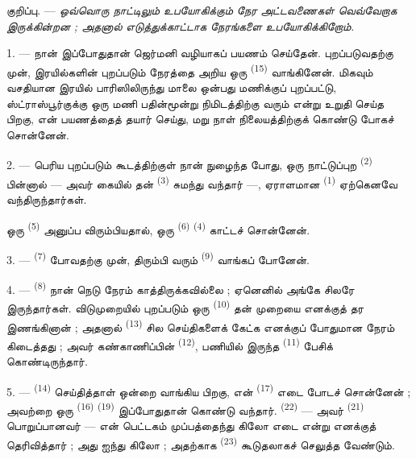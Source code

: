\VUsaut{4.0mm}
\VUsaut{2.4mm}
\VUsaut{3.4mm}
\textsc{குறிப்பு.} --- \textit{ஒவ்வொரு நாட்டிலும் உபயோகிக்கும் நேர}
\textit{அட்டவணைகள் வெவ்வேறாக இருக்கின்றன ; அதனால் எடுத்துக்காட்டாக}
 \textit{நேரங்களை உபயோகிக்கிறோம்.}

1. --- நான் இப்போதுதான் ஜெர்மனி வழியாகப் பயணம் செய்தேன். புறப்படுவதற்கு
முன், இரயில்களின் புறப்படும் நேரத்தை அறிய ஒரு  \textsuperscript{(15)} வாங்கினேன். மிகவும் வசதியான இரயில்
பாரிஸிலிருந்து மாலை ஒன்பது மணிக்குப் புறப்பட்டு, ஸ்ட்ராஸ்பூர்குக்கு
ஒரு மணி பதின்மூன்று நிமிடத்திற்கு வரும் என்று உறுதி செய்த பிறகு, என்
பயணத்தைத் தயார் செய்து, மறு நாள் நிலையத்திற்குக் கொண்டு போகச்
சொன்னேன்.

2. --- பெரிய புறப்படும் கூடத்திற்குள் நான் நுழைந்த போது, ஒரு நாட்டுப்புற
 \textsuperscript{(2)} பின்னால் — அவர் கையில் தன்
 \textsuperscript{(3)} சுமந்து வந்தார் —, ஏராளமான
 \textsuperscript{(1)} ஏற்கெனவே வந்திருந்தார்கள்.

ஒரு  \textsuperscript{(5)} அனுப்ப விரும்பியதால், ஒரு
 \textsuperscript{(6)} 
\textsuperscript{(4)} காட்டச் சொன்னேன்.

3. ---  \textsuperscript{(7)} போவதற்கு
முன், திரும்பி வரும்  \textsuperscript{(9)} வாங்கப்
போனேன்.

4. ---  \textsuperscript{(8)} நான் நெடு நேரம்
காத்திருக்கவில்லை ; ஏனெனில் அங்கே சிலரே இருந்தார்கள். விடுமுறையில்
புறப்படும் ஒரு  \textsuperscript{(10)} தன் முறையை எனக்குத்
தர இணங்கினான் ; அதனால்  \textsuperscript{(13)}
சில செய்திகளைக் கேட்க எனக்குப் போதுமான நேரம் கிடைத்தது ; அவர்
கண்காணிப்பின்  \textsuperscript{(12)}, பணியில்
இருந்த  \textsuperscript{(11)} பேசிக்
கொண்டிருந்தார்.

\VUsaut{3.0mm}

5. ---  \textsuperscript{(14)} செய்தித்தாள்
ஒன்றை வாங்கிய பிறகு, என் 
\textsuperscript{(17)} எடை போடச் சொன்னேன் ; அவற்றை ஒரு  \textsuperscript{(16)} 
\textsuperscript{(19)} இப்போதுதான் கொண்டு வந்தார்.  \textsuperscript{(22)} — அவர்  \textsuperscript{(21)} பொறுப்பானவர் — என் பெட்டகம் முப்பத்தைந்து கிலோ எடை என்று
எனக்குத் தெரிவித்தார் ; அது ஐந்து கிலோ  ;
அதற்காக  \textsuperscript{(23)} கூடுதலாகச்
செலுத்த வேண்டும்.

